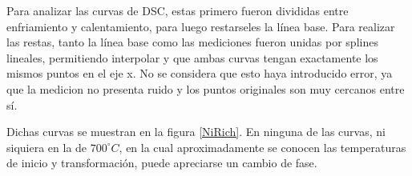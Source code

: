 \documentclass{article}
\theoremstyle{definition}
\theoremstyle{remark}
\begin{document}
Para analizar las curvas de DSC, estas primero fueron divididas entre enfriamiento y calentamiento, para luego restarseles la línea base. Para realizar las restas, tanto la línea base como las mediciones fueron unidas por splines lineales, permitiendo interpolar y que ambas curvas tengan exactamente los mismos puntos en el eje x. No se considera que esto haya introducido error, ya que la medicion no presenta ruido y los puntos originales son muy cercanos entre sí.

Dichas curvas se muestran en la figura \ref{NiRich}. En ninguna de las curvas, ni siquiera en la de $700 ^\circ C$, en la cual aproximadamente se conocen las temperaturas de inicio y transformación, puede apreciarse un cambio de fase.

\begin{figure}[H]
\noindent{}\\
\noindent{}
\end{figure}
\end{document}
